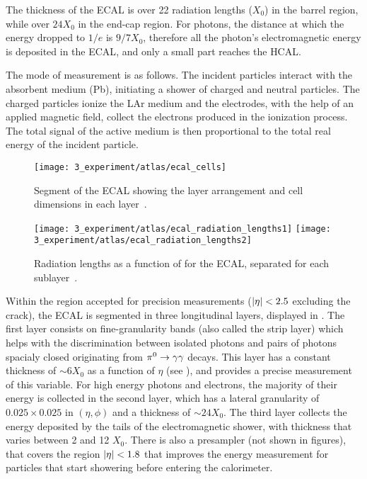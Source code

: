 The thickness of the \ac{ECAL} is over 22 radiation lengths (\(X_0\)) in the barrel region, while over \(24 X_0\) in the end-cap region. For photons, the distance at which the energy dropped to \(1/e\) is \(9/7 X_0\), therefore all the photon's electromagnetic energy is deposited in the \ac{ECAL}, and only a small part reaches the \ac{HCAL}.

The mode of measurement is as follows. The incident particles interact with the absorbent medium (Pb), initiating a shower of charged and neutral particles. The charged particles ionize the \ac{LAr} medium and the electrodes, with the help of an applied magnetic field, collect the electrons produced in the ionization process. The total signal of the active medium is then proportional to the total real energy of the incident particle.

\begin{figure}[ht!]
    \centering
    \texttt{[image: 3\_experiment/atlas/ecal\_cells]}
    \caption{Segment of the \ac{ECAL} showing the layer arrangement and cell dimensions in each layer~\cite{AtlasExperiment}.}
    \label{fig:atlas:atlas:cals:ecal:ecal_cells}
\end{figure}

\begin{figure}[ht!]
    \centering
    \texttt{[image: 3\_experiment/atlas/ecal\_radiation\_lengths1]}
    \texttt{[image: 3\_experiment/atlas/ecal\_radiation\_lengths2]}
    \caption{Radiation lengths as a function of \abseta for the \ac{ECAL}, separated for each sublayer~\cite{AtlasExperiment}.}
    \label{fig:atlas:atlas:cals:ecal:ecal_radiation_length}
\end{figure}

Within the region accepted for precision measurements (\(|\eta|<2.5\) excluding the crack), the \ac{ECAL} is segmented in three longitudinal layers, displayed in \Fig{\ref{fig:atlas:atlas:cals:ecal:ecal_cells}}.
The first layer consists on fine-granularity bands (also called the strip layer) which helps with the discrimination between isolated photons and pairs of photons spacialy closed originating from \(\pi^{0}\rightarrow\gamma\gamma\) decays. This layer has a constant thickness of \(\sim 6 X_0\) as a function of \(\eta\) (see \Fig{\ref{fig:atlas:atlas:cals:ecal:ecal_radiation_length}}), and provides a precise measurement of this variable.
For high energy photons and electrons, the majority of their energy is collected in the second layer, which has a lateral granularity of \(0.025 \times 0.025\) in \((\eta, \phi)\) and a thickness of \(\sim 24 X_0\).
The third layer collects the energy deposited by the tails of the electromagnetic shower, with thickness that varies between 2 and 12 \(X_0\).
There is also a presampler (not shown in figures), that covers the region \(|\eta|<1.8\) that improves the energy measurement for particles that start showering before entering the calorimeter.




